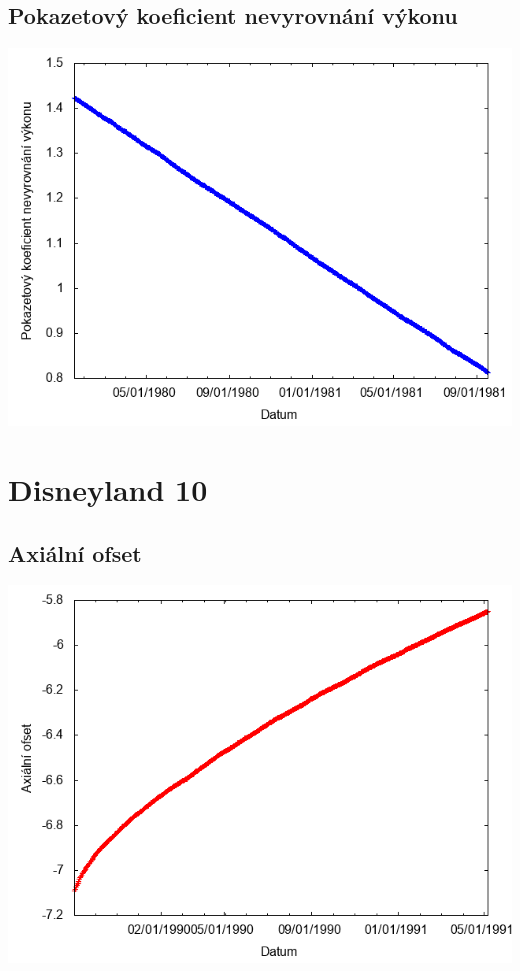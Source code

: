 \documentclass[a4paper,twoside,11pt]{article}
\begin{document}
\subsection*{Pokazetový koeficient nevyrovnání výkonu}
\begin{center}
\includegraphics[width=.8\textwidth]{graphs/Disneyland_09_fha.png}
\end{center}

\newpage
\section*{Disneyland 10}
\subsection*{Axiální ofset}
\begin{center}
\includegraphics[width=.8\textwidth]{graphs/Disneyland_10_ao.png}
\end{center}
\end{document}
